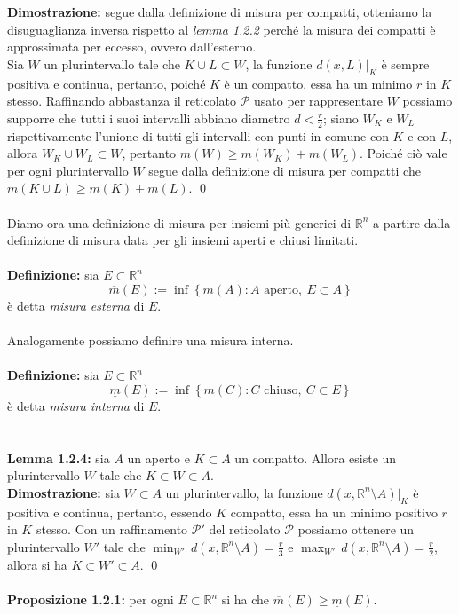 \documentclass{article}
\numberwithin{equation}{subsection}
\begin{document}
\textbf{Dimostrazione:} segue dalla definizione di misura per compatti, otteniamo la disuguaglianza inversa rispetto al \textit{lemma 1.2.2} perché la misura dei compatti è approssimata per eccesso, ovvero dall'esterno. \\Sia $W$ un plurintervallo tale che $K \cup L \subset W$, la funzione $d(x, L)|_K$ è sempre positiva e continua, pertanto, poiché $K$ è un compatto, essa ha un minimo $r$ in $K$ stesso. Raffinando abbastanza il reticolato $\mathcal{P}$ usato per rappresentare $W$ possiamo supporre che tutti i suoi intervalli abbiano diametro $d < \frac{r}{2}$; siano $W_K$ e $W_L$ rispettivamente l'unione di tutti gli intervalli con punti in comune con $K$ e con $L$, allora $W_K \cup W_L \subset W$, pertanto $m(W) \geq m(W_K) + m(W_L)$. Poiché ciò vale per ogni plurintervallo $W$ segue dalla definizione di misura per compatti che $m(K \cup L) \geq m(K) + m(L)$. \qed \\ \\
Diamo ora una definizione di misura per insiemi più generici di $\mathbb{R}^n$ a partire dalla definizione di misura data per gli insiemi aperti e chiusi limitati. \\ \\
\textbf{Definizione:} sia $E \subset \mathbb{R}^n$
\begin{equation*}
    \overline{m}(E) := \inf\left\{ m(A) : A \text{ aperto}, \ E \subset A \right\} 
\end{equation*}
è detta \textit{misura esterna} di $E$. \\ \\
Analogamente possiamo definire una misura interna. \\ \\
\textbf{Definizione:} sia $E \subset \mathbb{R}^n$
\begin{equation*}
    \underline{m}(E) := \inf\left\{ m(C) : C \text{ chiuso}, \ C \subset E \right\} 
\end{equation*}
è detta \textit{misura interna} di $E$. \\ \\ \\
\textbf{Lemma 1.2.4:} sia $A$ un aperto e $K \subset A$ un compatto. Allora esiste un plurintervallo $W$ tale che $K \subset W \subset A$. \\

\textbf{Dimostrazione:} sia $W \subset A$ un plurintervallo, la funzione $d(x, \mathbb{R}^n \setminus A)|_K$ è positiva e continua, pertanto, essendo $K$ compatto, essa ha un minimo positivo $r$ in $K$ stesso. Con un raffinamento $\mathcal{P}'$ del reticolato $\mathcal{P}$ possiamo ottenere un plurintervallo $W'$ tale che $\min_{W'} \, d(x, \mathbb{R}^n \setminus A) = \frac{r}{3}$ e $\max_{W'} \, d(x, \mathbb{R}^n \setminus A) = \frac{r}{2}$, allora si ha $K \subset W' \subset A$. \qed \\ \\
\textbf{Proposizione 1.2.1:} per ogni $E \subset \mathbb{R}^n$ si ha che $\overline{m}(E) \geq \underline{m}(E)$. \\
\end{document}
